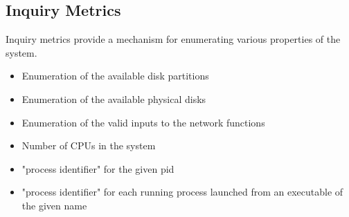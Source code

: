 \subsection{Inquiry Metrics}
Inquiry metrics provide a mechanism for enumerating various properties of the system.
\begin{itemize}
\item Enumeration of the available disk partitions 
\item Enumeration of the available physical disks 
\item Enumeration of the valid inputs to the network functions 
\item Number of CPUs in the system 
\item "process identifier" for the given pid 
\item "process identifier" for each running process launched from an executable of the given name
\end{itemize}

